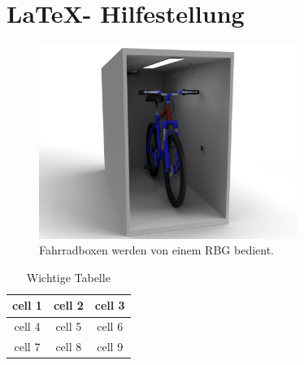 \section{\LaTeX - Hilfestellung}

\begin{figure}[h]
  \centering
  \includegraphics[width=0.75\textwidth]{images/test}
  \caption{Fahrradboxen werden von einem \ac{RBG} bedient.}
  \label{fig:fahrrad_box}
\end{figure}

\begin{table}[h]
  \begin{center}
    \begin{tabular} { |c|c|c| }
      \hline
      cell 1 & cell 2 & cell 3 \\
      \hline
      cell 4 & cell 5 & cell 6 \\
      cell 7 & cell 8 & cell 9 \\
      \hline
    \end{tabular}
    \caption{Wichtige Tabelle \cite{testbook:aaaa}}
    \label{tab:wichtige_tabelle}
  \end{center}
\end{table}
